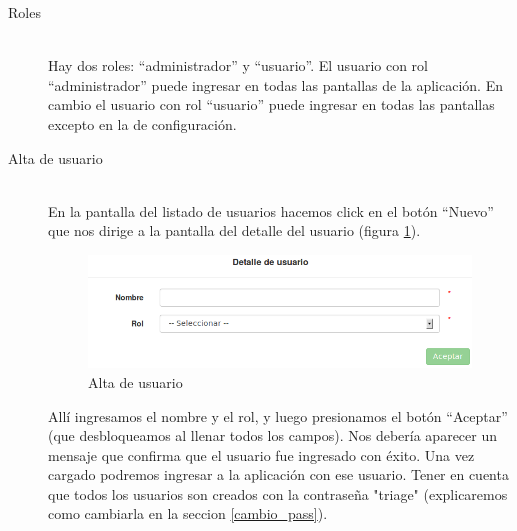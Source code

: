 \begin{description}
\item[Roles] \mbox{} \\
Hay dos roles: ``administrador'' y ``usuario''. El usuario con rol ``administrador'' puede ingresar en todas las pantallas de la aplicación. En cambio el usuario con rol ``usuario'' puede ingresar en todas las pantallas excepto en la de configuración.

\item[Alta de usuario] \mbox{} \\
En la pantalla del listado de usuarios hacemos click en el botón ``Nuevo'' que nos dirige a la pantalla del detalle del usuario (figura \ref{fig:nuevo_usuario}).
\begin{figure}
\centerline{\includegraphics[width=1\textwidth]{nuevo_usuario.png}}
\caption{Alta de usuario}
\label{fig:nuevo_usuario}
\end{figure}
Allí ingresamos el nombre y el rol, y luego presionamos el botón ``Aceptar'' (que desbloqueamos al llenar todos los campos). Nos debería aparecer un mensaje que confirma que el usuario fue ingresado con éxito. Una vez cargado podremos ingresar a la aplicación con ese usuario. Tener en cuenta que todos los usuarios son creados con la contraseña "triage" (explicaremos como cambiarla en la seccion \ref{cambio_pass}).


\end{description}
